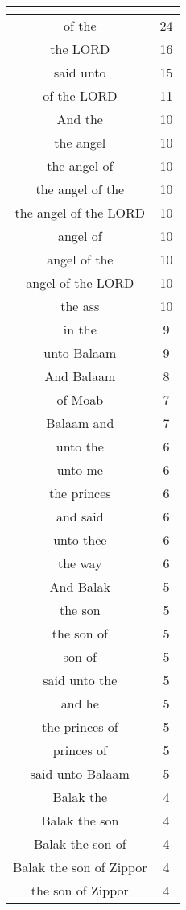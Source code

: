 \begin{center}
\begin{longtable}{|c|c|}
\hline \multicolumn{2}{c}{{ }} \\ \hline
\endfoot 
of the & 24\\ \hline 
the LORD & 16\\ \hline 
said unto & 15\\ \hline 
of the LORD & 11\\ \hline 
And the & 10\\ \hline 
the angel & 10\\ \hline 
the angel of & 10\\ \hline 
the angel of the & 10\\ \hline 
the angel of the LORD & 10\\ \hline 
angel of & 10\\ \hline 
angel of the & 10\\ \hline 
angel of the LORD & 10\\ \hline 
the ass & 10\\ \hline 
in the & 9\\ \hline 
unto Balaam & 9\\ \hline 
And Balaam & 8\\ \hline 
of Moab & 7\\ \hline 
Balaam and & 7\\ \hline 
unto the & 6\\ \hline 
unto me & 6\\ \hline 
the princes & 6\\ \hline 
and said & 6\\ \hline 
unto thee & 6\\ \hline 
the way & 6\\ \hline 
And Balak & 5\\ \hline 
the son & 5\\ \hline 
the son of & 5\\ \hline 
son of & 5\\ \hline 
said unto the & 5\\ \hline 
and he & 5\\ \hline 
the princes of & 5\\ \hline 
princes of & 5\\ \hline 
said unto Balaam & 5\\ \hline 
Balak the & 4\\ \hline 
Balak the son & 4\\ \hline 
Balak the son of & 4\\ \hline 
Balak the son of Zippor & 4\\ \hline 
the son of Zippor & 4\\ \hline 

\end{longtable}
\end{center}
